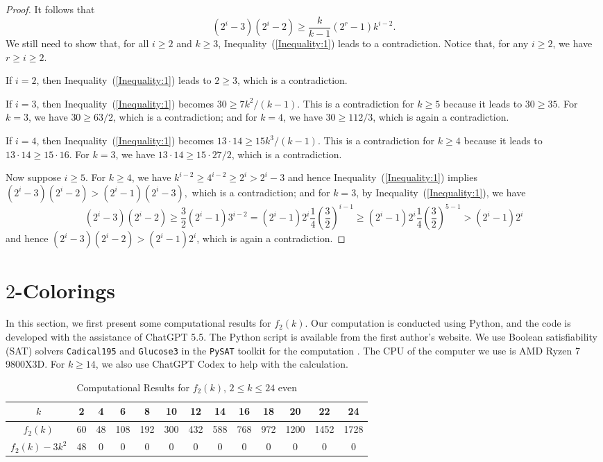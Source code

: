 \documentclass[10pt,a4paper]{amsart}
\begin{document}
\begin{proof}
    It follows that
    \begin{equation}\label{Inequality:1}
(2^i-3)(2^i-2)\geq\frac{k}{k-1}(2^r-1)k^{i-2}.  
\end{equation}
We still need to show that, for all $i\geq2$ and $k\geq3$, Inequality~(\ref{Inequality:1}) leads to a contradiction. Notice that, for any $i\geq2$, we have $r\geq i\geq2$. 

If $i=2$, then Inequality~(\ref{Inequality:1}) leads to $2\geq3$, which is a contradiction. 

If $i=3$, then Inequality~(\ref{Inequality:1}) becomes $30\geq7k^2/(k-1)$. This is a contradiction for $k\geq5$ because it leads to $30\geq35$. For $k=3$, we have $30\geq63/2$, which is a contradiction; and for $k=4$, we have $30\geq112/3$, which is again a contradiction.

If $i=4$, then Inequality~(\ref{Inequality:1}) becomes $13\cdot14\geq15k^3/(k-1)$. This is a contradiction for $k\geq4$ because it leads to $13\cdot14\geq15\cdot16$. For $k=3$, we have $13\cdot14\geq15\cdot27/2$, which is a contradiction.

Now suppose $i\geq5$. For $k\geq4$, we have $k^{i-2}\geq4^{i-2}\geq 2^i>2^i-3$ and hence Inequality~(\ref{Inequality:1}) implies
$
(2^i-3)(2^i-2)>(2^i-1)(2^i-3),
$
which is a contradiction; and for $k=3$, by Inequality~(\ref{Inequality:1}), we have
    \[
    (2^i-3)(2^i-2)\geq\frac{3}{2}(2^i-1)3^{i-2}=(2^i-1)2^i\frac{1}{4}\left(\frac{3}{2}\right)^{i-1}\geq(2^i-1)2^i\frac{1}{4}\left(\frac{3}{2}\right)^{5-1}>(2^i-1)2^i
    \]
    and hence $(2^i-3)(2^i-2)>(2^i-1)2^i$, which is again a contradiction.
\end{proof}

\section{$2$-Colorings}\label{Section:Computation2Coloring}
In this section, we first present some computational results for $f_2(k)$. Our computation is conducted using Python, and the code is developed with the assistance of ChatGPT 5.5. The Python script is available from the first author's website. We use Boolean satisfiability (SAT) solvers \texttt{Cadical195} and \texttt{Glucose3} in the \texttt{PySAT} toolkit for the computation \cite{ITK2024}. The CPU of the computer we use is AMD Ryzen 7 9800X3D. For $k\geq14$, we also use ChatGPT Codex to help with the calculation.



\begin{table}[H]
\renewcommand{\arraystretch}{1.5}
\centering
\begin{tabular}{|c|c|c|c|c|c|c|c|c|c|c|c|c|}
\hline
$k$&2&4&6&8&10&12&14&16&18&20&22&24\\\hline
$f_2(k)$&60&48&108&192&300&432&588&768&972&1200&1452&1728\\\hline
$f_2(k)-3k^2$&48&0&0&0&0&0&0&0&0&0&0&0\\\hline
\end{tabular}
\caption{Computational Results for $f_2(k)$, $2\leq k\leq 24$ even}\label{Table1}
\end{table}
\end{document}
